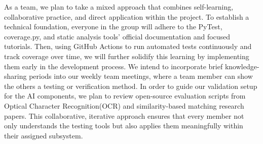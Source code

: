 \documentclass[12pt, titlepage]{article}
\begin{document}
\begin{enumerate}
  \hspace{2em} As a team, we plan to take a mixed approach that combines self-learning, collaborative practice, and direct application within the project. To establish a technical foundation, everyone in the group will adhere to the PyTest, coverage.py, and static analysis tools' official documentation and focused tutorials. Then, using GitHub Actions to run automated tests continuously and track coverage over time, we will further solidify this learning by implementing them early in the development process. We intend to incorporate brief knowledge-sharing periods into our weekly team meetings, where a team member can show the others a testing or verification method. In order to guide our validation setup for the AI components, we plan to review open-source evaluation scripts from Optical Character Recognition(OCR) and similarity-based matching research papers.  This collaborative, iterative approach ensures that every member not only understands the testing tools but also applies them meaningfully within their assigned subsystem.

\end{enumerate}
\end{document}
